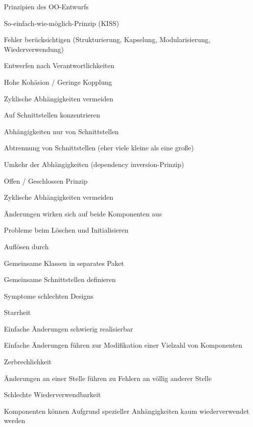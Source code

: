 \documentclass[a4paper]{article}
\begin{document}
\begin{multicols}{3}
  Prinzipien des OO-Entwurfs
  \begin{itemize*}
    \item So-einfach-wie-möglich-Prinzip (KISS)
    \item Fehler berücksichtigen (Strukturierung, Kapselung, Modularisierung, Wiederverwendung)
    \item Entwerfen nach Verantwortlichkeiten
    \item Hohe Kohäsion / Geringe Kopplung
    \item Zyklische Abhängigkeiten vermeiden
    \item Auf Schnittstellen konzentrieren
    \begin{itemize*}
      \item Abhängigkeiten nur von Schnittstellen
      \item Abtrennung von Schnittstellen (eher viele kleine als eine große)
      \item Umkehr der Abhängigkeiten (dependency inversion-Prinzip)
    \end{itemize*}
    \item Offen / Geschlossen Prinzip
  \end{itemize*}

  Zyklische Abhängigkeiten vermeiden
  \begin{itemize*}
    \item Änderungen wirken sich auf beide Komponenten aus
    \item Probleme beim Löschen und Initialisieren
    \item Auflösen durch
    \begin{itemize*}
      \item Gemeinsame Klassen in separates Paket
      \item Gemeinsame Schnittstellen definieren
    \end{itemize*}
  \end{itemize*}

  Symptome schlechten Designs
  \begin{itemize*}
    \item Starrheit
    \begin{itemize*}
      \item Einfache Änderungen schwierig realisierbar
      \item Einfache Änderungen führen zur Modifikation einer Vielzahl von Komponenten
    \end{itemize*}
    \item Zerbrechlichkeit
    \begin{itemize*}
      \item Änderungen an einer Stelle führen zu Fehlern an völlig anderer Stelle
    \end{itemize*}
    \item Schlechte Wiederverwendbarkeit
    \begin{itemize*}
      \item Komponenten können Aufgrund spezieller Anhängigkeiten kaum wiederverwendet werden
    \end{itemize*}
  \end{itemize*}


\end{multicols}
\end{document}
